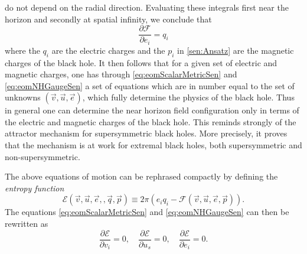 \documentclass[12pt,twoside]{book}
\begin{document}
do not depend on the radial direction. Evaluating these integrals first near the horizon and secondly at spatial infinity, we conclude that
\begin{equation}\label{eq:eomNHGaugeSen}
\frac{\partial \mathcal{F}}{\partial e_{i}} = q_{i}
\end{equation}
where the $q_{i}$ are the electric charges and the $p_{i}$ in \eqref{sen:Ansatz} are the magnetic charges of the black hole. It then follows that for a given set of electric and magnetic charges, one has through \eqref{eq:eomScalarMetricSen} and \eqref{eq:eomNHGaugeSen} a set of equations which are in number equal to the set of unknowns $(\vec{v},\vec{u},\vec{e})$, which fully determine the physics of the black hole. Thus in general one can determine the near horizon field configuration only in terms of the electric and magnetic charges of the black hole. This reminds strongly of the attractor mechanism for supersymmetric black holes. More precisely, it proves that the mechanism is at work for extremal black holes, both supersymmetric and non-supersymmetric.

The above equations of motion can be rephrased compactly by defining the \emph{entropy function} \cite{Sen:2005kx}
\begin{equation}
\mathcal{E}(\vec{v},\vec{u},\vec{e},,\vec{q},\vec{p}) \equiv
2\pi \left( e_{i}q_{i} - \mathcal{F}(\vec{v},\vec{u},\vec{e},\vec{p})\right).
\end{equation}
The equations \eqref{eq:eomScalarMetricSen} and \eqref{eq:eomNHGaugeSen} can then be rewritten as
\begin{equation}\label{sen:eomEntrFunc}
\frac{\partial \mathcal{E}}{\partial v_{i}} = 0, \quad
\frac{\partial \mathcal{E}}{\partial u_{s}} = 0, \quad
\frac{\partial \mathcal{E}}{\partial e_{i}} = 0.
\end{equation}
\end{document}
